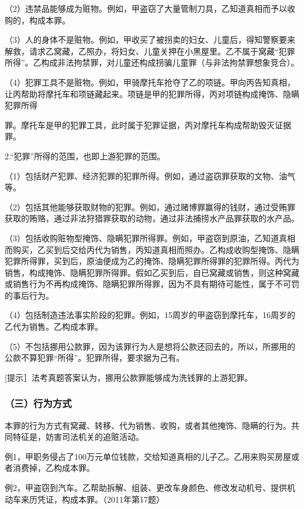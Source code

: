 （2）违禁品能够成为赃物。例如，甲盗窃了大量管制刀具，乙知道真相而予以收购的，构成本罪。

（3）人的身体不是赃物。例如，甲收买了被拐卖的妇女、儿童后，得知警察要来解救，请求乙窝藏，乙照办，将妇女、儿童关押在小黑屋里。乙不属于窝藏“犯罪所得”。乙构成非法拘禁罪，对儿童还构成拐骗儿童罪（与非法拘禁罪想象竞合）。

（4）犯罪工具不是赃物。例如，甲骑摩托车抢夺了乙的项链。甲向丙告知真相，让丙帮助将摩托车和项链藏起来。项链是甲的犯罪所得，丙对项链构成掩饰、隐瞒犯罪所得

罪。摩托车是甲的犯罪工具，此时属于犯罪证据，丙对摩托车构成帮助毁灭证据罪。

2.“犯罪”所得的范围，也即上游犯罪的范围。

（1）包括财产犯罪、经济犯罪的犯罪所得。例如，通过盗窃罪获取的文物、油气等。

（2）包括其他能够获取财物的犯罪。例如，通过赌博罪赢得的钱财，通过受贿罪获取的贿赂，通过非法狩猎罪获取的动物，通过非法捕捞水产品罪获取的水产品。

（3）包括收购赃物型掩饰、隐瞒犯罪所得罪。例如，甲盗窃到原油，乙知道真相而购买，乙买到后交给丙代为销售，丙知道真相而照办。乙构成收购型掩饰、隐瞒犯罪所得罪，买到后，原油便成为乙的掩饰、隐瞒犯罪所得罪的犯罪所得。丙代为销售，构成掩饰、隐瞒犯罪所得罪。假如乙买到后，自已窝藏或销售，则这种窝藏或销售行为不再构成掩饰、隐瞒犯罪所得罪，因为不具有期待可能性，属于不可罚的事后行为。

（4）包括制造违法事实阶段的犯罪。例如，15周岁的甲盗窃到摩托车，16周岁的乙代为销售。乙构成本罪。

（5）不包括挪用公款罪，因为该罪行为人是想将公款还回去的，所以，所挪用的公款不算犯罪“所得”。犯罪所得，要求据为己有。

[提示］法考真题答案认为，挪用公款罪能够成为洗钱罪的上游犯罪。

\subsubsection*{（三）行为方式}

本罪的行为方式有窝藏、转移、代为销售、收购，或者其他掩饰、隐瞒的行为。共同特征是，妨害司法机关的追赃活动。

例1，甲职务侵占了100万元单位钱款，交给知道真相的儿子乙。乙用来购买房屋或者消费掉，乙构成本罪。

例2，甲盗窃到汽车。乙帮助拆解、组装、更改车身颜色、修改发动机号、提供机动车来历凭证，构成本罪。（2011年第17题）

